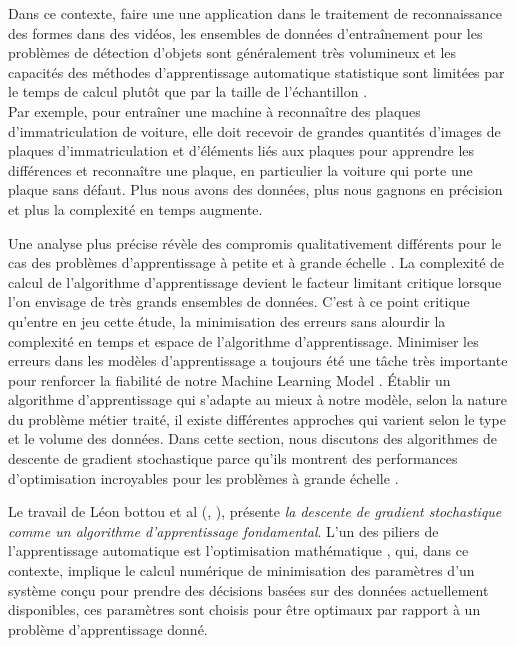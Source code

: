 		Dans ce contexte, faire une une application dans le traitement de reconnaissance des formes dans des vidéos, les ensembles de données d'entraînement pour les  problèmes de détection d'objets sont généralement très volumineux et les capacités des méthodes d'apprentissage automatique statistique sont limitées par le temps de calcul plutôt que par la taille de l'échantillon \cite{bottou2010large}.\\
		Par exemple, pour entraîner une machine à reconnaître des plaques d'immatriculation de voiture, elle doit recevoir de grandes quantités d'images de plaques d'immatriculation et d'éléments liés aux plaques pour apprendre les différences et reconnaître une plaque, en particulier la voiture qui porte une plaque sans défaut. Plus nous avons des données, plus nous gagnons en précision et plus la complexité en temps augmente.
		
		Une analyse plus précise révèle des compromis qualitativement différents pour le cas des problèmes d'apprentissage à petite et à grande échelle \cite{bottou2010large}. La complexité de calcul de l'algorithme d'apprentissage devient le facteur limitant critique lorsque l'on envisage de très grands ensembles de données. C'est à ce point critique qu'entre en jeu cette étude, la minimisation des erreurs sans alourdir la complexité en temps et espace de l’algorithme d’apprentissage. Minimiser les erreurs dans les modèles d’apprentissage a toujours été une tâche très importante pour renforcer la fiabilité de notre Machine Learning Model \cite{ibm2018ml}. Établir un algorithme d’apprentissage qui s'adapte au mieux à notre modèle, selon la nature du problème métier traité, il existe différentes approches qui varient selon le type et le volume des données. Dans cette section, nous discutons des algorithmes de descente de gradient stochastique parce qu’ils montrent des performances  d'optimisation incroyables pour les problèmes à grande échelle \cite{bottou2010large}.
		
		Le travail de Léon bottou et al (\eg, \cite{bottou2010large} \cite{wijnhoven2010fast} \cite{bottou2012stochastic} ), présente \textit{la descente de gradient stochastique comme un algorithme d'apprentissage fondamental}.
		L'un des piliers de l'apprentissage automatique est l'optimisation mathématique \cite[Jorge Nocedal dans][page: 3]{bottou2018optimization}, qui, dans ce contexte, implique le calcul numérique de minimisation des paramètres d'un système conçu pour prendre des décisions basées sur des données actuellement disponibles, ces paramètres sont choisis pour être optimaux par rapport à un problème d'apprentissage donné.
		
